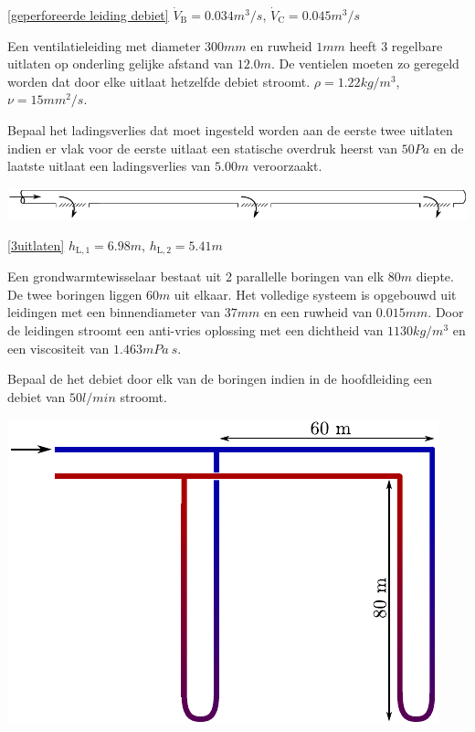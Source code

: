 \begin{antwoord}{\ref{geperforeerde leiding debiet}}
	$\dot{V}_\mathrm{B} = 0.034 \unit{m^3/s}$, $\dot{V}_\mathrm{C} = 0.045 \unit{m^3/s}$
\end{antwoord}
\begin{toepassing}
	\label{3uitlaten}
Een ventilatieleiding met diameter $300 \unit{mm}$ en ruwheid $1 \unit{mm}$ heeft 3 regelbare uitlaten op onderling gelijke afstand van $12.0 \unit{m}$. De ventielen moeten zo geregeld worden dat door elke uitlaat hetzelfde debiet stroomt. $\rho = 1.22 \unit{kg/m^3}$, $\nu = 15 \unit{mm^2/s}$.
	
Bepaal het ladingsverlies dat moet ingesteld worden aan de eerste twee uitlaten indien er vlak voor de eerste uitlaat een statische overdruk heerst van $50 \unit{Pa}$ en de laatste uitlaat een ladingsverlies van $5.00 \unit{m}$ veroorzaakt.

	\centering
	\includegraphics{fig/leidingstelsels/3uitlaten}
\end{toepassing}
\begin{antwoord}{\ref{3uitlaten}}
	$h_\mathrm{L,1} = 6.98 \unit{m}$, $h_\mathrm{L,2} = 5.41 \unit{m}$
\end{antwoord}
\begin{toepassing}[*]
	\label{grondwarmtewisselaar}
Een grondwarmtewisselaar bestaat uit 2 parallelle boringen van elk $80 \unit{m}$ diepte. De twee boringen liggen $60 \unit{m}$ uit elkaar. Het volledige systeem is opgebouwd uit leidingen met een binnendiameter van $37 \unit{mm}$ en een ruwheid van $0.015 \unit{mm}$. Door de leidingen stroomt een anti-vries oplossing met een dichtheid van $1130 \unit{kg/m^3}$ en een viscositeit van $1.463 \unit{mPa\ s}$.
	
Bepaal de het debiet door elk van de boringen indien in de hoofdleiding een debiet van $50 \unit{l/min}$ stroomt.

	\centering	
	\includegraphics{fig/leidingstelsels/grondwarmtewisselaar}
\end{toepassing}
